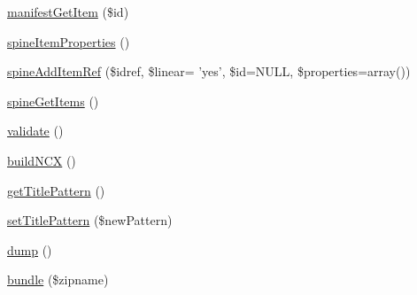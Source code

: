 \begin{DoxyCompactItemize}
\item 
\hyperlink{classFunnyMonkey_1_1EPUB_1_1EPUBPackage_a46a30fa86db5efa83deda580ed4f3260}{manifest\-Get\-Item} (\$id)
\item 
\hyperlink{classFunnyMonkey_1_1EPUB_1_1EPUBPackage_aacdb8aadbab42bccc18fae01d3d455c7}{spine\-Item\-Properties} ()
\item 
\hyperlink{classFunnyMonkey_1_1EPUB_1_1EPUBPackage_aaddd96b731a29b604f5b4fe5995031c4}{spine\-Add\-Item\-Ref} (\$idref, \$linear= 'yes', \$id=\-N\-U\-L\-L, \$properties=array())
\item 
\hyperlink{classFunnyMonkey_1_1EPUB_1_1EPUBPackage_a0e85d8848e03f2f3c03ee2b50e537a2d}{spine\-Get\-Items} ()
\item 
\hyperlink{classFunnyMonkey_1_1EPUB_1_1EPUBPackage_a29183fe1d73c85e69bb9f8996cefd048}{validate} ()
\item 
\hyperlink{classFunnyMonkey_1_1EPUB_1_1EPUBPackage_ab6dc98afca9a7ee46178f98e7f3398b4}{build\-N\-C\-X} ()
\item 
\hyperlink{classFunnyMonkey_1_1EPUB_1_1EPUBPackage_a4c718d4f1fb4ab9bc743ebe7eced2f5e}{get\-Title\-Pattern} ()
\item 
\hyperlink{classFunnyMonkey_1_1EPUB_1_1EPUBPackage_adc1394b5bbd440b842b5a9df9b0ba1d6}{set\-Title\-Pattern} (\$new\-Pattern)
\item 
\hyperlink{classFunnyMonkey_1_1EPUB_1_1EPUBPackage_a9e0bfd9beeb108f0dd07bbbcc51f8b85}{dump} ()
\item 
\hyperlink{classFunnyMonkey_1_1EPUB_1_1EPUBPackage_a75e88263e46bf52c71dc9a9f263954c7}{bundle} (\$zipname)
\end{DoxyCompactItemize}

